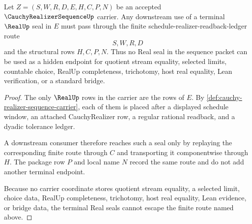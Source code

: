 \begin{theorem}
\label{thm:cauchy-realizer-sequence-real-seal-nonescape}
Let $Z=(S,W,R,D,E,H,C,P,N)$ be an accepted $\CauchyRealizerSequenceUp$ carrier. Any downstream use of a terminal $\RealUp$ seal in $E$ must pass through the finite schedule-realizer-readback-ledger route
$$
S,W,R,D
$$
and the structural rows $H,C,P,N$. Thus no Real seal in the sequence packet can be used as a hidden endpoint for quotient stream equality, selected limits, countable choice, RealUp completeness, trichotomy, host real equality, Lean verification, or a standard bridge.
\end{theorem}
\begin{proof}
The only $\RealUp$ rows in the carrier are the rows of $E$. By \autoref{def:cauchy-realizer-sequence-carrier}, each of them is placed after a displayed schedule window, an attached CauchyRealizer row, a regular rational readback, and a dyadic tolerance ledger.

A downstream consumer therefore reaches such a seal only by replaying the corresponding finite route through $C$ and transporting it componentwise through $H$. The package row $P$ and local name $N$ record the same route and do not add another terminal endpoint.

Because no carrier coordinate stores quotient stream equality, a selected limit, choice data, RealUp completeness, trichotomy, host real equality, Lean evidence, or bridge data, the terminal Real seals cannot escape the finite route named above.
\end{proof}




